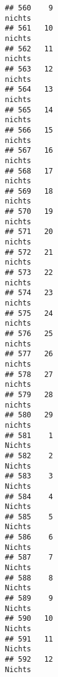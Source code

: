 \documentclass[
]{article}
\begin{document}
\begin{verbatim}
## 560    9                                                              nichts
## 561   10                                                              nichts
## 562   11                                                              nichts
## 563   12                                                              nichts
## 564   13                                                              nichts
## 565   14                                                              nichts
## 566   15                                                              nichts
## 567   16                                                              nichts
## 568   17                                                              nichts
## 569   18                                                              nichts
## 570   19                                                              nichts
## 571   20                                                              nichts
## 572   21                                                              nichts
## 573   22                                                              nichts
## 574   23                                                              nichts
## 575   24                                                              nichts
## 576   25                                                              nichts
## 577   26                                                              nichts
## 578   27                                                              nichts
## 579   28                                                              nichts
## 580   29                                                              nichts
## 581    1                                                              Nichts
## 582    2                                                              Nichts
## 583    3                                                              Nichts
## 584    4                                                              Nichts
## 585    5                                                              Nichts
## 586    6                                                              Nichts
## 587    7                                                              Nichts
## 588    8                                                              Nichts
## 589    9                                                              Nichts
## 590   10                                                              Nichts
## 591   11                                                              Nichts
## 592   12                                                              Nichts

\end{verbatim}
\end{document}
